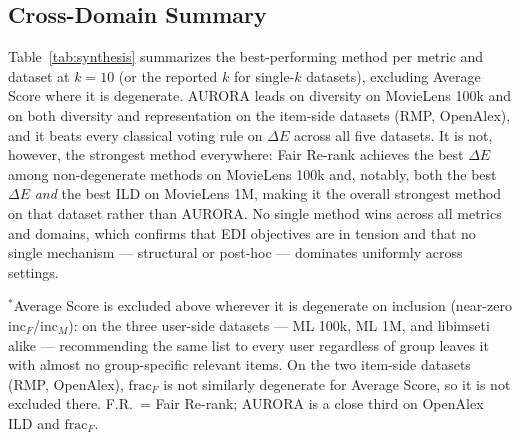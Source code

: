 \documentclass[runningheads]{llncs}
\begin{document}
\subsection{Cross-Domain Summary}

Table~\ref{tab:synthesis} summarizes the best-performing method per
metric and dataset at $k=10$ (or the reported $k$ for single-$k$
datasets), excluding Average Score where it is degenerate. AURORA leads
on diversity on MovieLens 100k and on both diversity and representation
on the item-side datasets (RMP, OpenAlex), and it beats every classical
voting rule on $\Delta E$ across all five datasets. It is not, however,
the strongest method everywhere: Fair Re-rank achieves the best $\Delta
E$ among non-degenerate methods on MovieLens 100k and, notably, both the
best $\Delta E$ \emph{and} the best ILD on MovieLens 1M, making it the
overall strongest method on that dataset rather than AURORA. No single
method wins across all metrics and domains, which confirms that EDI
objectives are in tension and that no single mechanism --- structural or
post-hoc --- dominates uniformly across settings.

\begin{table}[h!]
\caption{Cross-domain summary: best method per metric at $k=10$ (or the
single reported $k$ for libimseti, RMP, OpenAlex).}
\label{tab:synthesis}
\centering
\footnotesize
{}
\par\smallskip
\footnotesize $^*$Average Score is excluded above wherever it is
degenerate on inclusion (near-zero $\mathrm{inc}_F$/$\mathrm{inc}_M$): on
the three user-side datasets --- ML 100k, ML 1M, and libimseti alike ---
recommending the same list to every user regardless of group leaves it
with almost no group-specific relevant items. On the two item-side
datasets (RMP, OpenAlex), $\mathrm{frac}_F$ is not similarly degenerate for
Average Score, so it is not excluded there. F.R.\ = Fair Re-rank; AURORA
is a close third on OpenAlex ILD and $\mathrm{frac}_F$.
\end{table}
\end{document}
